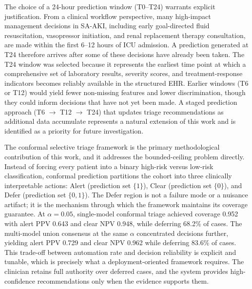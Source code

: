 The choice of a 24-hour prediction window (T0--T24) warrants explicit justification. From a clinical workflow perspective, many high-impact management decisions in SA-AKI, including early goal-directed fluid resuscitation, vasopressor initiation, and renal replacement therapy consultation, are made within the first 6--12 hours of ICU admission. A prediction generated at T24 therefore arrives after some of these decisions have already been taken. The T24 window was selected because it represents the earliest time point at which a comprehensive set of laboratory results, severity scores, and treatment-response indicators becomes reliably available in the structured EHR. Earlier windows (T6 or T12) would yield fewer non-missing features and lower discrimination, though they could inform decisions that have not yet been made. A staged prediction approach (T6 $\to$ T12 $\to$ T24) that updates triage recommendations as additional data accumulate represents a natural extension of this work and is identified as a priority for future investigation.

The conformal selective triage framework is the primary methodological contribution of this work, and it addresses the bounded-ceiling problem directly. Instead of forcing every patient into a binary high-risk versus low-risk classification, conformal prediction partitions the cohort into three clinically interpretable actions: Alert (prediction set $\{1\}$), Clear (prediction set $\{0\}$), and Defer (prediction set $\{0,1\}$). The Defer region is not a failure mode or a nuisance artifact; it is the mechanism through which the framework maintains its coverage guarantee.\cite{Vovk2005,Angelopoulos2021} At $\alpha = 0.05$, single-model conformal triage achieved coverage 0.952 with alert PPV 0.643 and clear NPV 0.948, while deferring 68.2\% of cases. The multi-model union consensus at the same $\alpha$ concentrated decisions further, yielding alert PPV 0.729 and clear NPV 0.962 while deferring 83.6\% of cases. This trade-off between automation rate and decision reliability is explicit and tunable, which is precisely what a deployment-oriented framework requires. The clinician retains full authority over deferred cases, and the system provides high-confidence recommendations only when the evidence supports them.

